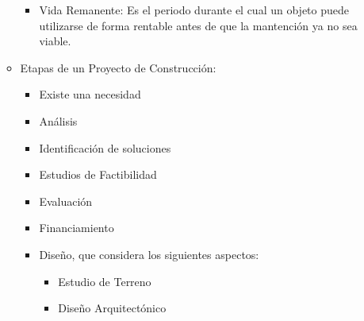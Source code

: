 \documentclass{article} %
\begin{document}
\begin{itemize}[label={},left=0pt,align=parleft]
\begin{itemize}[label={},left=1em,align=parleft]
\begin{itemize}[label={},left=2em,align=parleft]
            \item \begin{highlightbox}[levelthree] Vida Remanente: Es el periodo durante el cual un objeto puede utilizarse de forma rentable antes de que la mantención ya no sea viable. \end{highlightbox}
        \end{itemize}
        \item \begin{highlightbox}[leveltwo] Etapas de un Proyecto de Construcción: \end{highlightbox}
        \begin{itemize}[label={},left=2em,align=parleft]
            \item \begin{highlightbox}[levelthree] Existe una necesidad \end{highlightbox}
            \item \begin{highlightbox}[levelthree] Análisis \end{highlightbox}
            \item \begin{highlightbox}[levelthree] Identificación de soluciones \end{highlightbox}
            \item \begin{highlightbox}[levelthree] Estudios de Factibilidad \end{highlightbox}
            \item \begin{highlightbox}[levelthree] Evaluación \end{highlightbox}
            \item \begin{highlightbox}[levelthree] Financiamiento \end{highlightbox}
            \item \begin{highlightbox}[levelthree] Diseño, que considera los siguientes aspectos: \end{highlightbox}
            \begin{itemize}[label={},left=3em,align=parleft]
                \item \begin{highlightbox}[levelfour] Estudio de Terreno \end{highlightbox}
                \item \begin{highlightbox}[levelfour] Diseño Arquitectónico \end{highlightbox}

\end{itemize}
\end{itemize}
\end{itemize}
\end{itemize}
\end{document}
